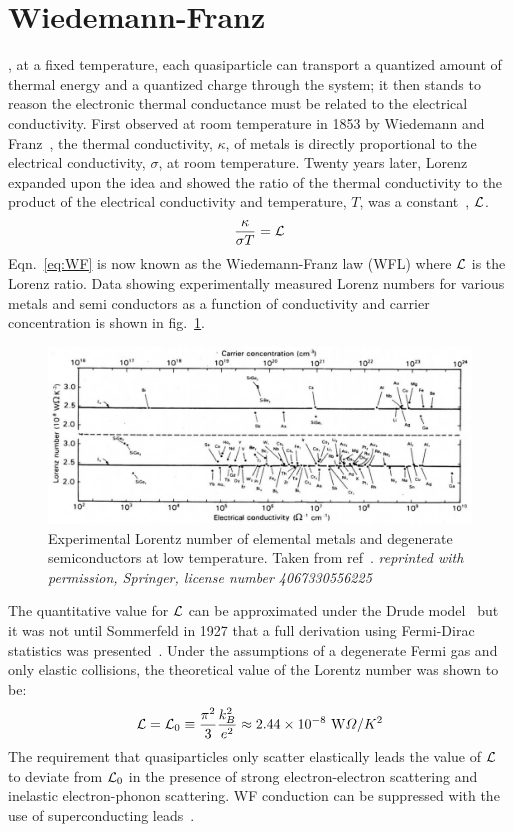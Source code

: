 \section{Wiedemann-Franz}
, at a fixed temperature, each quasiparticle can transport a quantized amount of thermal energy and a quantized charge through the system; it then stands to reason the electronic thermal conductance must be related to the electrical conductivity. First observed at room temperature in 1853 by Wiedemann and Franz~\cite{franz_ueber_1853},  the thermal conductivity, $\kappa$, of metals is directly proportional to the electrical conductivity, $\sigma$, at room temperature. Twenty years later, Lorenz expanded upon the idea and showed the ratio of the thermal conductivity to the product of the electrical conductivity and temperature, $T$, was a constant~\cite{lorenz_bestimmung_1872}, $\mathcal{L}$.
\begin{equation}\label{eq:WF}
\frac{\kappa}{\sigma T} = \mathcal{L}
\end{equation}
Eqn.~\ref{eq:WF} is now known as the Wiedemann-Franz law (WFL) where $\mathcal{L}$ is the Lorenz ratio. Data showing experimentally measured Lorenz numbers for various metals and semi conductors as a function of conductivity and carrier concentration is shown in fig.~\ref{fig:WF_in_metals}.
\begin{figure}
\centering
\includegraphics[width=\textwidth]{figures/electronic_cooling/WF_in_metals.png}
\caption{Experimental Lorentz number of elemental metals and degenerate semiconductors at low temperature. Taken from ref~\cite{kumar_experimental_1993}. \textit{reprinted with permission, Springer, license number 4067330556225}}
\label{fig:WF_in_metals}
\end{figure}
The quantitative value for $\mathcal{L}$ can be approximated under the Drude model~\cite{ashcroft_solid_1976} but it was not until Sommerfeld in 1927 that a full derivation using Fermi-Dirac statistics was presented~\cite{sommerfeld}. Under the assumptions of a degenerate Fermi gas and only elastic collisions, the theoretical value of the Lorentz number was shown to be:
\begin{equation}
\mathcal{L} = \mathcal{L}_0 \equiv \frac{\pi^2}{3}\frac{k_B^2}{e^2} \approx 2.44\times10^{-8}~\mathrm{W}\Omega/K^2
\end{equation}
The requirement that quasiparticles only scatter elastically leads the value of $\mathcal{L}$ to deviate from $\mathcal{L}_0$ in the presence of strong electron-electron scattering and inelastic electron-phonon scattering. WF conduction can be suppressed with the use of superconducting leads~\cite{mckitterick_prospects_2015}.

